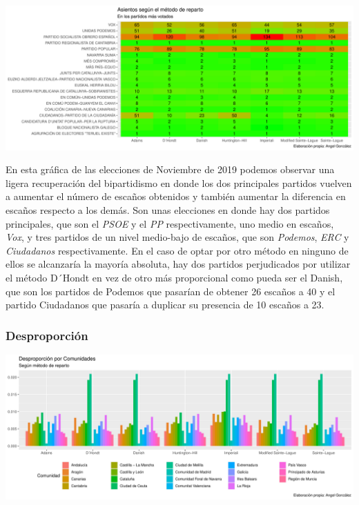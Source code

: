 \documentclass[12pt,a4paper,]{book}
\numberwithin{dummy}{section}
\theoremstyle{ocrenumbox}
\theoremstyle{blacknumex}
\theoremstyle{blacknumbox}
\theoremstyle{ocrenum}
\theoremstyle{ocrenum}
\begin{document}
\begin{center}\includegraphics[width=0.95\linewidth]{figurasR/unnamed-chunk-137-2} \end{center}

En esta gráfica de las elecciones de Noviembre de 2019 podemos observar
una ligera recuperación del bipartidismo en donde los dos principales
partidos vuelven a aumentar el número de escaños obtenidos y también
aumentar la diferencia en escaños respecto a los demás. Son unas
elecciones en donde hay dos partidos principales, que son el \emph{PSOE}
y el \emph{PP} respectivamente, uno medio en escaños, \emph{Vox}, y tres
partidos de un nivel medio-bajo de escaños, que son \emph{Podemos},
\emph{ERC} y \emph{Ciudadanos} respectivamente. En el caso de optar por
otro método en ninguno de ellos se alcanzaría la mayoría absoluta, hay
dos partidos perjudicados por utilizar el método D´Hondt en vez de otro
más proporcional como pueda ser el Danish, que son los partidos de
Podemos que pasarían de obtener 26 escaños a 40 y el partido Ciudadanos
que pasaría a duplicar su presencia de 10 escaños a 23.

\hypertarget{desproporciuxf3n-14}{%
\subsubsection{Desproporción}\label{desproporciuxf3n-14}}

\begin{center}\includegraphics[width=0.95\linewidth]{figurasR/unnamed-chunk-138-1} \end{center}
\end{document}
